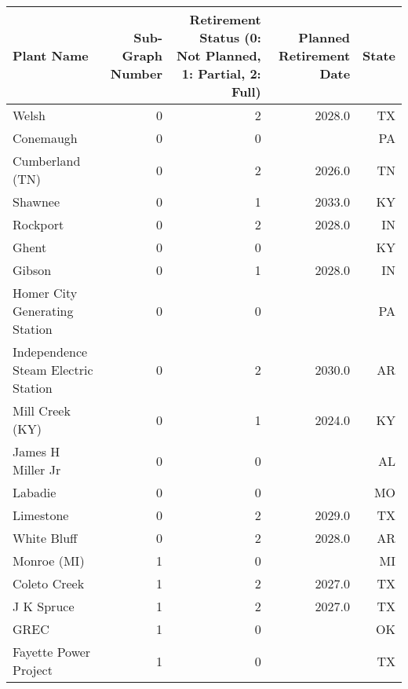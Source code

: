 \begin{table}[htb]
  \centering
  \small
  \begin{adjustbox}{width=\textwidth}
     \begin{tabular}{|l|r|r|r|r|}
         \toprule
         Plant Name & Sub-Graph Number & Retirement Status (0: Not Planned, 1: Partial, 2: Full) & Planned Retirement Date & State \\
         \midrule
             Welsh &         0 &           2 &           2028.0 &    TX \\
         Conemaugh &         0 &           0 &                &    PA \\
   Cumberland (TN) &         0 &           2 &           2026.0 &    TN \\
           Shawnee &         0 &           1 &           2033.0 &    KY \\
          Rockport &         0 &           2 &           2028.0 &    IN \\
             Ghent &         0 &           0 &                &    KY \\
            Gibson &         0 &           1 &           2028.0 &    IN \\
Homer City Generating Station &         0 &           0 &                &    PA \\
Independence Steam Electric Station &         0 &           2 &           2030.0 &    AR \\
   Mill Creek (KY) &         0 &           1 &           2024.0 &    KY \\
 James H Miller Jr &         0 &           0 &                &    AL \\
           Labadie &         0 &           0 &                &    MO \\
         Limestone &         0 &           2 &           2029.0 &    TX \\
       White Bluff &         0 &           2 &           2028.0 &    AR \\
       Monroe (MI) &         1 &           0 &                &    MI \\
      Coleto Creek &         1 &           2 &           2027.0 &    TX \\
        J K Spruce &         1 &           2 &           2027.0 &    TX \\
              GREC &         1 &           0 &                &   OK  \\
Fayette Power Project &         1 &           0 &                &   TX \\

\end{tabular}
\end{adjustbox}
\end{table}
